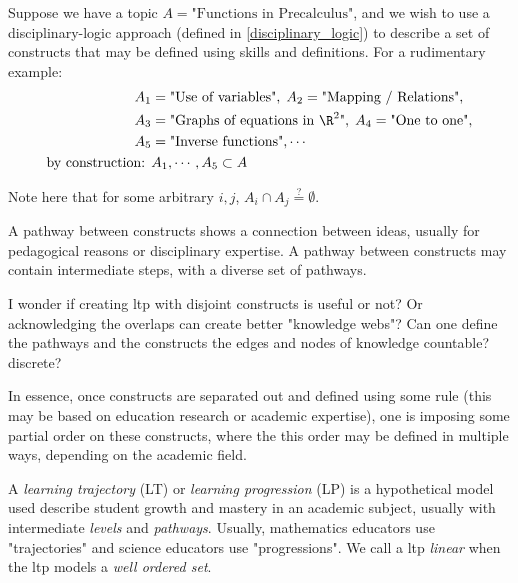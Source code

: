 \documentclass{TC}
\begin{document}
\begin{example}
Suppose we have a topic $A = \text{"Functions in Precalculus"}$, and we wish to use a disciplinary-logic approach (defined in \ref{disciplinary_logic}) to describe a set of constructs that may be defined using skills and definitions. For a rudimentary example:
\begin{align*}
A_1 &= \text{"Use of variables"},\;A_2 = \text{"Mapping / Relations"},\\
A_3 &= \text{"Graphs of equations in } \R^2 \text{"},\;A_4 = \text{"One to one"},\\
A_5 &= \text{"Inverse functions"}, \cdots \\
\text{by construction: }& A_1, \cdots, A_5 \subset A
\end{align*} 
\end{example}
Note here that for some arbitrary $i,j$, $A_i \cap A_j \stackrel{?}{=} \emptyset$. 
\begin{mdframed}
\begin{definition}
A pathway between constructs shows a connection between ideas, usually for pedagogical reasons or disciplinary expertise. A pathway between constructs may contain intermediate steps, with a diverse set of pathways. 
\end{definition}
\end{mdframed}

\begin{remark}
I wonder if creating \gls{ltp} with disjoint constructs is useful or not? Or acknowledging the overlaps can create better "knowledge webs"? Can one define the pathways and the constructs the edges and nodes of knowledge countable? discrete?
\end{remark}
 
 In essence, once constructs are separated out and defined using some rule (this may be based on education research or academic expertise), one is imposing some partial order on these constructs, where the this order may be defined in multiple ways, depending on the academic field.
 
 \begin{mdframed}
\begin{definition}
A \emph{learning trajectory} (LT) or \emph{learning progression} (LP) is a hypothetical model used describe student growth and mastery in an academic subject, usually with intermediate \emph{levels} and \emph{pathways}. Usually, mathematics educators use "trajectories" and science educators use "progressions". We call a \gls{ltp} \emph{linear} when the \gls{ltp} models a \emph{well ordered set}.
\end{definition}
\end{mdframed}
\end{document}
